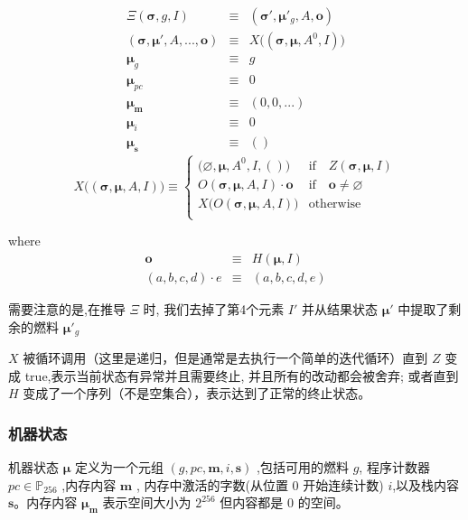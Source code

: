 \documentclass[9pt,oneside]{amsart}
\begin{document}
\begin{multicols}{2}
\begin{eqnarray}
\Xi(\boldsymbol{\sigma}, g, I) & \equiv & (\boldsymbol{\sigma}'\!, \boldsymbol{\mu}'_g, A, \mathbf{o}) \\
(\boldsymbol{\sigma}, \boldsymbol{\mu}'\!, A, ..., \mathbf{o}) & \equiv & X\big((\boldsymbol{\sigma}, \boldsymbol{\mu}, A^0\!, I)\big) \\
\boldsymbol{\mu}_g & \equiv & g \\
\boldsymbol{\mu}_{pc} & \equiv & 0 \\
\boldsymbol{\mu}_\mathbf{m} & \equiv & (0, 0, ...) \\
\boldsymbol{\mu}_i & \equiv & 0 \\
\boldsymbol{\mu}_\mathbf{s} & \equiv & ()
\end{eqnarray}
\begin{equation}
X\big( (\boldsymbol{\sigma}, \boldsymbol{\mu}, A, I) \big) \equiv \begin{cases}
\big(\varnothing, \boldsymbol{\mu}, A^0, I, ()\big) & \text{if} \quad Z(\boldsymbol{\sigma}, \boldsymbol{\mu}, I)\\
O(\boldsymbol{\sigma}, \boldsymbol{\mu}, A, I) \cdot \mathbf{o} & \text{if} \quad \mathbf{o} \neq \varnothing\\
X\big(O(\boldsymbol{\sigma}, \boldsymbol{\mu}, A, I)\big) & \text{otherwise}\\
\end{cases}
\end{equation}

where
\begin{eqnarray}
\mathbf{o} & \equiv & H(\boldsymbol{\mu}, I) \\
(a, b, c, d) \cdot e & \equiv & (a, b, c, d, e)
\end{eqnarray}

需要注意的是,在推导 $\Xi$ 时, 我们去掉了第4个元素 $I'$ 并从结果状态 $\boldsymbol{\mu}'$ 中提取了剩余的燃料 $\boldsymbol{\mu}'_g$

$X$ 被循环调用（这里是递归，但是通常是去执行一个简单的迭代循环）直到 $Z$  变成 true,表示当前状态有异常并且需要终止, 并且所有的改动都会被舍弃;  或者直到 $H$ 变成了一个序列（不是空集合），表示达到了正常的终止状态。

\subsubsection{机器状态}
机器状态 $\boldsymbol{\mu}$ 定义为一个元组 $(g, pc, \mathbf{m}, i, \mathbf{s})$ ,包括可用的燃料 $g$, 程序计数器 $pc \in \mathbb{P}_{256}$ ,内存内容 $\mathbf{m}$ , 内存中激活的字数(从位置 0 开始连续计数) $i$,以及栈内容 $\mathbf{s}$。内存内容 $\boldsymbol{\mu}_\mathbf{m}$ 表示空间大小为 $2^{256}$ 但内容都是 0 的空间。


\end{multicols}
\end{document}
